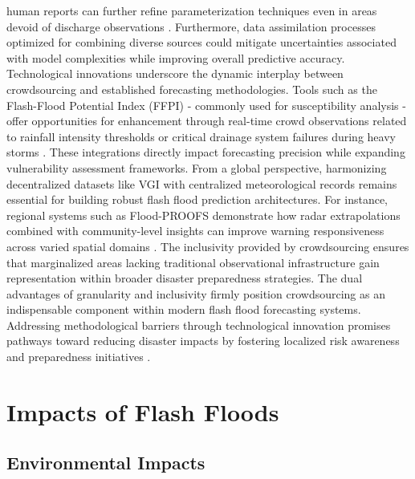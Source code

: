 human reports can further refine parameterization techniques even in areas devoid of discharge observations \citep{Silvestro2017}. Furthermore, data assimilation processes optimized for combining diverse sources could mitigate uncertainties associated with model complexities while improving overall predictive accuracy. Technological innovations underscore the dynamic interplay between crowdsourcing and established forecasting methodologies. Tools such as the Flash-Flood Potential Index (FFPI) - commonly used for susceptibility analysis - offer opportunities for enhancement through real-time crowd observations related to rainfall intensity thresholds or critical drainage system failures during heavy storms \citep{Lu2021}. These integrations directly impact forecasting precision while expanding vulnerability assessment frameworks. From a global perspective, harmonizing decentralized datasets like VGI with centralized meteorological records remains essential for building robust flash flood prediction architectures. For instance, regional systems such as Flood-PROOFS demonstrate how radar extrapolations combined with community-level insights can improve warning responsiveness across varied spatial domains \citep{Zanchetta2020}. The inclusivity provided by crowdsourcing ensures that marginalized areas lacking traditional observational infrastructure gain representation within broader disaster preparedness strategies. The dual advantages of granularity and inclusivity firmly position crowdsourcing as an indispensable component within modern flash flood forecasting systems. Addressing methodological barriers through technological innovation promises pathways toward reducing disaster impacts by fostering localized risk awareness and preparedness initiatives \citep{Lowrie2022}\citep{Zhang2022}\citep{Ngo2018}\citep{Silvestro2017}.



\section{Impacts of Flash Floods}

\subsection{Environmental Impacts}
